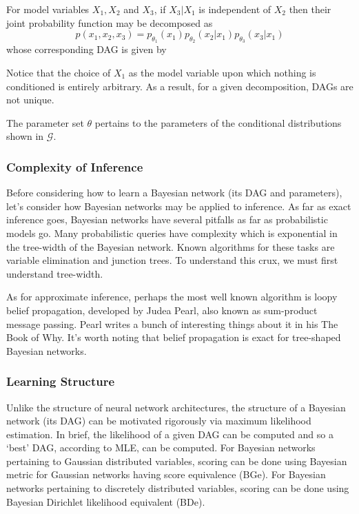 \documentclass[11pt]{article}
\begin{document}
\begin{example}
    For model variables $X_1, X_2$ and $X_3$, if $X_3|X_1$ is independent of $X_2$ then their joint probability function may be decomposed as
    $$
    p(x_1,x_2,x_3)
    =
    p_{\theta_1}(x_1)p_{\theta_2}(x_2|x_1)p_{\theta_3}(x_3|x_1)
    $$
    whose corresponding DAG is given by
    \begin{center}
    \end{center}
    Notice that the choice of $X_1$ as the model variable upon which nothing is conditioned is entirely arbitrary. As a result, for a given decomposition, DAGs are not unique.
\end{example}
The parameter set $\theta$ pertains to the parameters of the conditional distributions shown in $\mathcal{G}$.

\subsubsection{Complexity of Inference}
Before considering how to learn a Bayesian network (its DAG and parameters), let's consider how Bayesian networks may be applied to inference. As far as exact inference goes, Bayesian networks have several pitfalls as far as probabilistic models go. Many probabilistic queries have complexity which is exponential in the tree-width of the Bayesian network. Known algorithms for these tasks are variable elimination and junction trees. To understand this crux, we must first understand tree-width.

As for approximate inference, perhaps the most well known algorithm is loopy belief propagation, developed by Judea Pearl, also known as sum-product message passing. Pearl writes a bunch of interesting things about it in his The Book of Why. It's worth noting that belief propagation is exact for tree-shaped Bayesian networks.

\subsubsection{Learning Structure}
Unlike the structure of neural network architectures, the structure of a Bayesian network (its DAG) can be motivated rigorously via maximum likelihood estimation. In brief, the likelihood of a given DAG can be computed and so a `best' DAG, according to MLE, can be computed. For Bayesian networks pertaining to Gaussian distributed variables, scoring can be done using Bayesian metric for Gaussian networks having score equivalence (BGe). For Bayesian networks pertaining to discretely distributed variables, scoring can be done using Bayesian Dirichlet likelihood equivalent (BDe).
\end{document}
